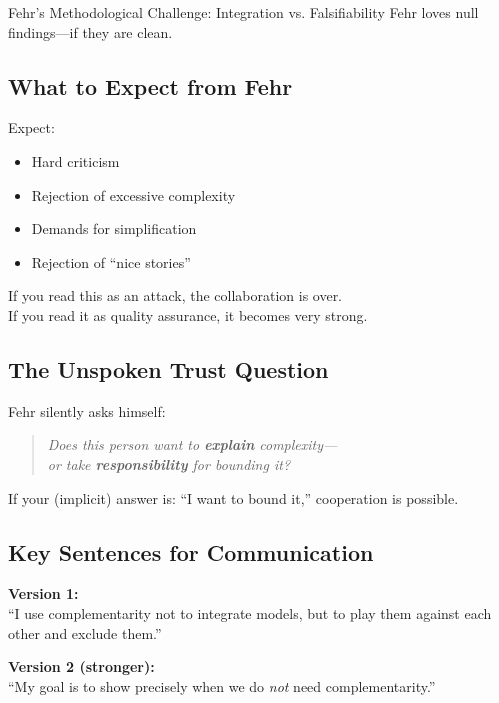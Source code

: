 \begin{chapter}{Fehr's Methodological Challenge: Integration vs. Falsifiability}
Fehr loves null findings---if they are clean.

\subsection{What to Expect from Fehr}

Expect:
\begin{itemize}[noitemsep]
    \item Hard criticism
    \item Rejection of excessive complexity
    \item Demands for simplification
    \item Rejection of ``nice stories''
\end{itemize}

If you read this as an attack, the collaboration is over.\\
If you read it as quality assurance, it becomes very strong.

\subsection{The Unspoken Trust Question}

Fehr silently asks himself:

\begin{quote}
\textit{Does this person want to \textbf{explain} complexity---\\
or take \textbf{responsibility} for bounding it?}
\end{quote}

If your (implicit) answer is: ``I want to bound it,'' cooperation is possible.

\subsection{Key Sentences for Communication}

\begin{tcolorbox}[colback=gray!10!white,colframe=gray!75!black,title=\textbf{What You Could Say to Fehr}]

\textbf{Version 1:}\\
``I use complementarity not to integrate models, but to play them against each other and exclude them.''

\vspace{0.5em}
\textbf{Version 2 (stronger):}\\
``My goal is to show precisely when we do \textit{not} need complementarity.''


\end{tcolorbox}
\end{chapter}
